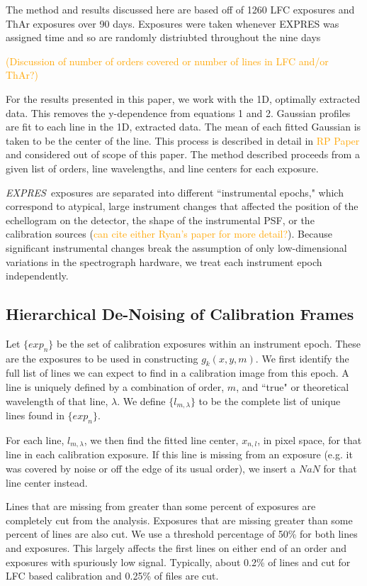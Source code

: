 \documentclass[12pt, letterpaper]{article}
\newcommand{\lz}[1]{\textcolor{orange}{#1}}
\newcommand{\project}[1]{\textsl{#1}}
\newcommand{\acronym}[1]{{\small{#1}}}
\newcommand{\expres}{\project{\acronym{EXPRES}}}
\begin{document}
The method and results discussed here are based off of 1260 LFC exposures and ThAr exposures over 90 days.  Exposures were taken whenever EXPRES was assigned time and so are randomly distriubted throughout the nine days

\lz{(Discussion of number of orders covered or number of lines in LFC and/or ThAr?)}

For the results presented in this paper, we work with the 1D, optimally extracted data.  This removes the y-dependence from equations 1 and 2.  Gaussian profiles are fit to each line in the 1D, extracted data.  The mean of each fitted Gaussian is taken to be the center of the line.  This process is described in detail in \lz{RP Paper} and considered out of scope of this paper.  The method described proceeds from a given list of orders, line wavelengths, and line centers for each exposure.

\expres\ exposures are separated into different ``instrumental epochs," which correspond to atypical, large instrument changes that affected the position of the echellogram on the detector, the shape of the instrumental PSF, or the calibration sources (\lz{can cite either Ryan's paper for more detail?}).  Because significant instrumental changes break the assumption of only low-dimensional variations in the spectrograph hardware, we treat each instrument epoch independently.

\subsection{Hierarchical De-Noising of Calibration Frames} \label{sec:denoising}
Let $\{exp_n\}$ be the set of calibration exposures within an instrument epoch.  These are the exposures to be used in constructing $g_k(x,y,m)$.  We first identify the full list of lines we can expect to find in a calibration image from this epoch.  A line is uniquely defined by a combination of order, $m$, and ``true" or theoretical wavelength of that line, $\lambda$.  We define $\{l_{m,\lambda}\}$ to be the complete list of unique lines found in $\{exp_n\}$.

For each line, $l_{m,\lambda}$, we then find the fitted line center, $x_{n,l}$, in pixel space, for that line in each calibration exposure.  If this line is missing from an exposure (e.g. it was covered by noise or off the edge of its usual order), we insert a $NaN$ for that line center instead.

Lines that are missing from greater than some percent of exposures are completely cut from the analysis.  Exposures that are missing greater than some percent of lines are also cut.  We use a threshold percentage of 50\% for both lines and exposures.  This largely affects the first lines on either end of an order and exposures with spuriously low signal.  Typically, about 0.2\% of lines and cut for LFC based calibration and 0.25\% of files are cut.
\end{document}
